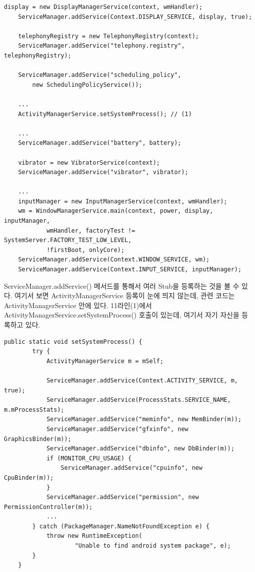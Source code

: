 \begin{lstlisting}[frame=single, caption=SystemServer.java] 
	display = new DisplayManagerService(context, wmHandler);
	ServiceManager.addService(Context.DISPLAY_SERVICE, display, true);
	
	telephonyRegistry = new TelephonyRegistry(context);
	ServiceManager.addService("telephony.registry", telephonyRegistry);
	
	ServiceManager.addService("scheduling_policy", 
		new SchedulingPolicyService());
		
	...
	ActivityManagerService.setSystemProcess(); // (1)
		
	...
	ServiceManager.addService("battery", battery);
	
	vibrator = new VibratorService(context);
	ServiceManager.addService("vibrator", vibrator);
	
	...
	inputManager = new InputManagerService(context, wmHandler);
	wm = WindowManagerService.main(context, power, display, inputManager,
	        wmHandler, factoryTest != SystemServer.FACTORY_TEST_LOW_LEVEL,
	        !firstBoot, onlyCore);
	ServiceManager.addService(Context.WINDOW_SERVICE, wm);
	ServiceManager.addService(Context.INPUT_SERVICE, inputManager);
\end{lstlisting}	    
ServiceManager.addService() 메서드를 통해서 여러 Stub을 등록하는 것을 볼 수 있다.
여기서 보면 ActivityManagerService 등록이 눈에 띄지 않는데, 관련 코드는 ActivityManagerService 안에 있다. 
11라인(1)에서 ActivityManagerService.setSystemProcess() 호출이 있는데, 여기서 자기 자신을 등록하고 있다.
\begin{lstlisting}[frame=single, caption=ActivityManagerService.java] 
   public static void setSystemProcess() {
        try {
            ActivityManagerService m = mSelf;

            ServiceManager.addService(Context.ACTIVITY_SERVICE, m, true);
            ServiceManager.addService(ProcessStats.SERVICE_NAME, m.mProcessStats);
            ServiceManager.addService("meminfo", new MemBinder(m));
            ServiceManager.addService("gfxinfo", new GraphicsBinder(m));
            ServiceManager.addService("dbinfo", new DbBinder(m));
            if (MONITOR_CPU_USAGE) {
                ServiceManager.addService("cpuinfo", new CpuBinder(m));
            }
            ServiceManager.addService("permission", new PermissionController(m));
 			...
        } catch (PackageManager.NameNotFoundException e) {
            throw new RuntimeException(
                    "Unable to find android system package", e);
        }
    }
\end{lstlisting}	    


